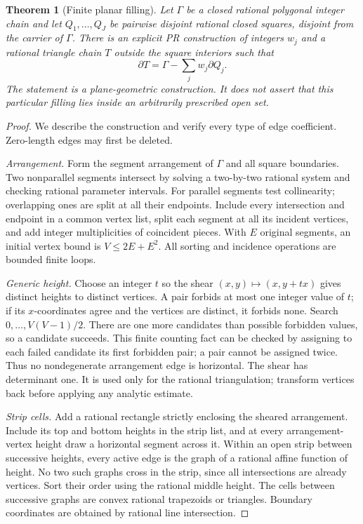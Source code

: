 \documentclass[11pt]{article}
\newtheorem{theorem}{Theorem}[section]
\theoremstyle{definition}
\newcommand{\bd}{\partial}
\begin{document}
\begin{theorem}[Finite planar filling]\label{thm:filling}
Let \(\Gamma\) be a closed rational polygonal integer chain and let
\(Q_1,\ldots,Q_J\) be pairwise disjoint rational closed squares,
disjoint from the carrier of \(\Gamma\). There is an explicit PR
construction of integers \(w_j\) and a rational triangle chain \(T\)
outside the square interiors such that
\[
 \bd T=\Gamma-\sum_jw_j\bd Q_j.
\]
The statement is a plane-geometric construction. It does not assert that
this particular filling lies inside an arbitrarily prescribed open set.
\end{theorem}
\begin{proof}
We describe the construction and verify every type of edge coefficient.
Zero-length edges may first be deleted.

\emph{Arrangement.} Form the segment arrangement of \(\Gamma\) and all
square boundaries. Two nonparallel segments intersect by solving a
two-by-two rational system and checking rational parameter intervals.
For parallel segments test collinearity; overlapping ones are split at
all their endpoints. Include every intersection and endpoint in a
common vertex list, split each segment at all its incident vertices,
and add integer multiplicities of coincident pieces. With \(E\) original
segments, an initial vertex bound is \(V\le2E+E^2\).
All sorting and incidence operations are bounded finite loops.

\emph{Generic height.} Choose an integer \(t\) so the shear
\((x,y)\mapsto(x,y+tx)\) gives distinct heights to distinct vertices.
A pair forbids at most one integer value of \(t\); if its \(x\)-coordinates
agree and the vertices are distinct, it forbids none. Search
\(0,\ldots,V(V-1)/2\). There are one more candidates than possible
forbidden values, so a candidate succeeds. This finite counting fact
can be checked by assigning to each failed candidate its first forbidden
pair; a pair cannot be assigned twice. Thus no nondegenerate arrangement
edge is horizontal. The shear has determinant one. It is used only for
the rational triangulation; transform vertices back before applying any
analytic estimate.

\emph{Strip cells.} Add a rational rectangle strictly enclosing the
sheared arrangement. Include its top and bottom heights in the strip
list, and at every arrangement-vertex height draw a horizontal segment
across it. Within an open strip between successive
heights, every active edge is the graph of a rational affine function
of height. No two such graphs cross in the strip, since all intersections
are already vertices. Sort their order using the rational middle
height. The cells between successive graphs are convex rational
trapezoids or triangles. Boundary coordinates are obtained by rational
line intersection.


\end{proof}
\end{document}
